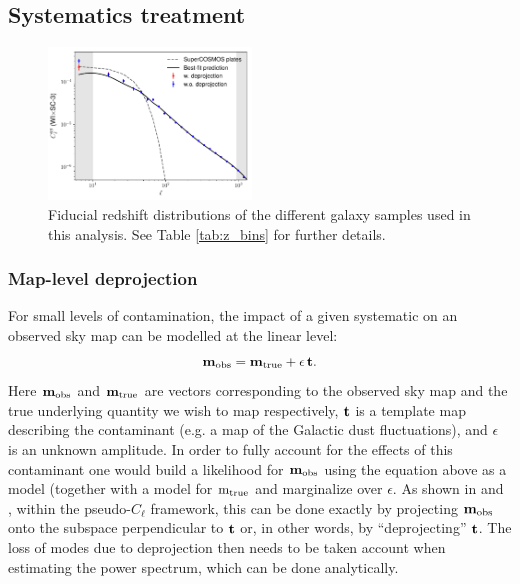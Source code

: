 \documentclass[useAMS,usenatbib]{mn2e}
\begin{document}
  \subsection{Systematics treatment}\label{ssec:methods.syst}
    \begin{figure}
      \centering
      \includegraphics[width=0.48\textwidth]{cl_syst_summary.pdf}
      \caption{Fiducial redshift distributions of the different galaxy samples used in this analysis. See Table \ref{tab:z_bins} for further details.}
      \label{fig:clsyst}
    \end{figure}
    \subsubsection{Map-level deprojection}\label{sssec:methods.syst.deproj}
      For small levels of contamination, the impact of a given systematic on an observed sky map can be modelled at the linear level:
      \begin{equation}
        {\bf m}_{\rm obs}={\bf m}_{\rm true} + \epsilon\,{\bf t}.
      \end{equation}
      Here ${\bf m}_{\rm obs}$ and ${\bf m}_{\rm true}$ are vectors corresponding to the observed sky map and the true underlying quantity we wish to map respectively, ${\bf t}$ is a template map describing the contaminant (e.g. a map of the Galactic dust fluctuations), and $\epsilon$ is an unknown amplitude. In order to fully account for the effects of this contaminant one would build a likelihood for ${\bf m}_{\rm obs}$ using the equation above as a model (together with a model for ${\rm m}_{\rm true}$ and marginalize over $\epsilon$. As shown in \cite{2017MNRAS.465.1847E} and \cite{2019MNRAS.484.4127A}, within the pseudo-$C_\ell$ framework, this can be done exactly by projecting ${\bf m}_{\rm obs}$ onto the subspace perpendicular to ${\bf t}$ or, in other words, by ``deprojecting'' ${\bf t}$. The loss of modes due to deprojection then needs to be taken account when estimating the power spectrum, which can be done analytically.
\end{document}
